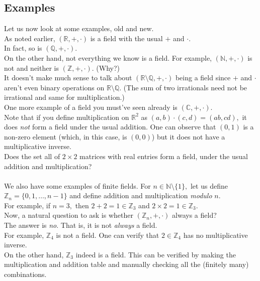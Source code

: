 \documentclass[12pt]{article}
\begin{document}
\subsection{Examples}
Let us now look at some examples, old and new.\\
As noted earlier, $(\mathbb{R}, +, \cdot)$ is a field with the usual $+$ and $\cdot.$\\
In fact, so is $(\mathbb{Q}, +, \cdot).$\\
On the other hand, not everything we know is a field. For example, $(\mathbb{N}, +, \cdot)$ is not and neither is $(\mathbb{Z}, +, \cdot).$ (Why?)\\
It doesn't make much sense to talk about $(\mathbb{R}\setminus\mathbb{Q}, +, \cdot)$ being a field since $+$ and $\cdot$ aren't even binary operations on $\mathbb{R}\setminus\mathbb{Q}.$ (The sum of two irrationals need not be irrational and same for multiplication.)\\
One more example of a field you must've seen already is $(\mathbb{C}, +, \cdot).$\\
Note that if you define multiplication on $\mathbb{R}^2$ as $(a, b)\cdot(c, d) = (ab, cd),$ it does \emph{not} form a field under the usual addition. One can observe that $(0, 1)$ is a non-zero element (which, in this case, is $(0, 0)$) but it does not have a multiplicative inverse. \\
Does the set all of $2\times2$ matrices with real entries form a field, under the usual addition and multiplication?\\~\\
We also have some examples of finite fields. For $n \in \mathbb{N}\setminus\{1\},$ let us define $\mathbb{Z}_n = \{0, 1, \ldots, n-1\}$ and define addition and multiplication \emph{modulo} $n.$\\
For example, if $n = 3,$ then $2 + 2 = 1 \in \mathbb{Z}_3$ and $2\times 2 = 1 \in \mathbb{Z}_3.$\\
Now, a natural question to ask is whether $(\mathbb{Z}_n, +, \cdot)$ always a field?\\
The answer is \emph{no}. That is, it is not \emph{always} a field.\\
For example, $\mathbb{Z}_4$ is not a field. One can verify that $2 \in \mathbb{Z}_4$ has no multiplicative inverse.\\
On the other hand, $\mathbb{Z}_3$ indeed is a field. This can be verified by making the multiplication and addition table and manually checking all the (finitely many) combinations.\\
\end{document}
